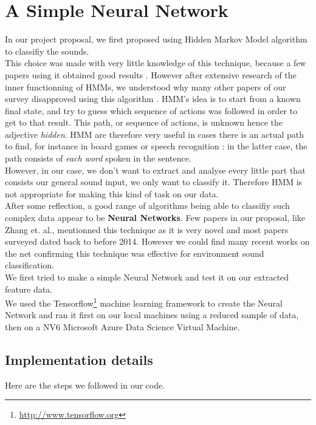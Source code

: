 \documentclass{article} %
\begin{document}
\section{A Simple Neural Network}
		In our project proposal, we first proposed using Hidden Markov Model algorithm to classifiy the sounds.\\
		This choice was made with very little knowledge of this technique, because a few papers using it obtained good results \cite{cite3} \cite{cite4}. However after extensive research of the inner functionning of HMMs, we understood why many other papers of our survey disapproved using this algorithm \cite{cite5} \cite{cite6}. HMM's idea is to start from a known final state, and try to guess which sequence of actions was followed in order to get to that result. This path, or sequence of actions, is unknown hence the adjective \emph{hidden}. HMM are therefore very useful in cases there is an actual path to find, for instance in board games or speech recognition : in the latter case, the path consists of \emph{each word} spoken in the sentence.\\
		\newline
		However, in our case, we don't want to extract and analyse every little part that consists our general sound input, we only want to classify it. Therefore HMM is not appropriate for making this kind of task on our data.\\
		\newline
		After some reflection, a good range of algorithms being able to classifiy such complex data appear to be \textbf{Neural Networks}. Few papers in our proposal, like Zhang et. al.\cite{cite6}, mentionned this technique as it is very novel and most papers surveyed dated back to before 2014. However we could find many recent works on the net confirming this technique was effective for environment sound classification.\\
		We first tried to make a simple Neural Network and test it on our extracted feature data.\\

		We used the Tensorflow\footnote{\url{http://www.tensorflow.org}} machine learning framework to create the Neural Network and ran it first on our local machines using a reduced sample of data, then on a NV6 Microsoft Azure Data Science Virtual Machine.

		\subsection{Implementation details}
			Here are the steps we followed in our code.
\end{document}

